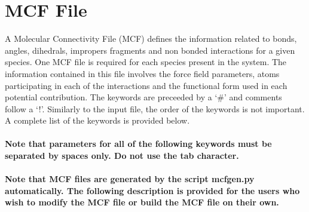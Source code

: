 {{{%
%
%
%
%
%
\section{MCF File}\label{sec:MCF_File}
%
A Molecular Connectivity File (MCF) defines the information related to bonds, angles, dihedrals, impropers
fragments and non bonded interactions for a given species. One MCF file is required for each species present in
the system. The information contained in this file involves the force field parameters, atoms
participating in each of the interactions and the functional form used in each potential contribution.
The keywords are preceeded by a `\#' and comments follow a `!'. Similarly to the input file, the order
of the keywords is not important. A complete list of the keywords is provided below. \\ \\
%
{\bf Note that parameters for all of the following keywords must be separated by spaces only. 
Do not use the tab character. \\ \\
%
Note that MCF files are generated by the script mcfgen.py automatically. The following description is provided for
the users who wish to modify the MCF file or build the MCF file on their own.} \\ \\ 

}}}
